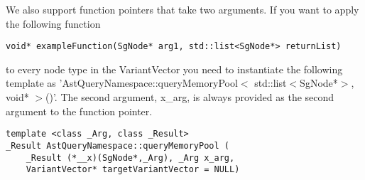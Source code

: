 We also support function pointers that take two arguments. If you want to apply the following function
\begin{verbatim}
void* exampleFunction(SgNode* arg1, std::list<SgNode*> returnList) 
\end{verbatim}
to every node type in the VariantVector you need to instantiate the following template as
'AstQueryNamespace::queryMemoryPool$<$ std::list$<$SgNode*$>$, void*  $>$()'. The second argument, x\_arg,
  is always provided as the second argument to the function pointer.
\begin{verbatim}
template <class _Arg, class _Result> 
_Result AstQueryNamespace::queryMemoryPool ( 
    _Result (*__x)(SgNode*,_Arg), _Arg x_arg,
    VariantVector* targetVariantVector = NULL)
\end{verbatim}


